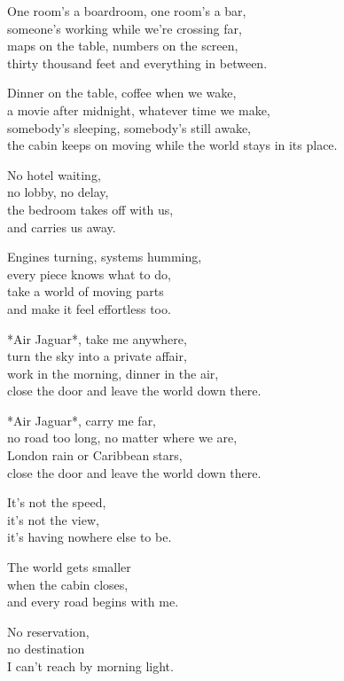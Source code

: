 \begin{lyrics}
One room's a boardroom, one room's a bar,\\
someone's working while we're crossing far,\\
maps on the table, numbers on the screen,\\
thirty thousand feet and everything in between.

Dinner on the table, coffee when we wake,\\
a movie after midnight, whatever time we make,\\
somebody's sleeping, somebody's still awake,\\
the cabin keeps on moving while the world stays in its place.


No hotel waiting,\\
no lobby, no delay,\\
the bedroom takes off with us,\\
and carries us away.

Engines turning, systems humming,\\
every piece knows what to do,\\
take a world of moving parts\\
and make it feel effortless too.


*Air Jaguar*, take me anywhere,\\
turn the sky into a private affair,\\
work in the morning, dinner in the air,\\
close the door and leave the world down there.

*Air Jaguar*, carry me far,\\
no road too long, no matter where we are,\\
London rain or Caribbean stars,\\
close the door and leave the world down there.


It's not the speed,\\
it's not the view,\\
it's having nowhere else to be.

The world gets smaller\\
when the cabin closes,\\
and every road begins with me.

No reservation,\\
no destination\\
I can't reach by morning light.


\end{lyrics}
